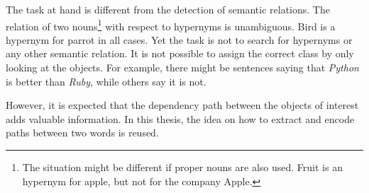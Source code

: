 The task at hand is different from the detection of semantic relations. The relation of two nouns\footnote{The situation might be different if proper nouns are also used. Fruit is an hypernym for apple, but not for the company Apple.} with respect to hypernyms is unambiguous. Bird is a hypernym for parrot in all cases. Yet the task is not to search for hypernyms or any other semantic relation. It is not possible to assign the correct class by only looking at the objects. For example, there might be sentences saying that \emph{Python} is better than \emph{Ruby}, while others say it is not.

However, it is expected that the dependency path between the objects of interest adds valuable information. In this thesis, the idea on how to extract and encode paths between two words is reused.



